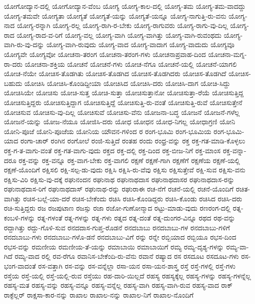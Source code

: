 {ಯೋಗೋದ್ಯಾನ-ದಲ್ಲಿ
ಯೋಗೋದ್ಯಾನ-ವೆಂಬ
ಯೋಗ್ಯ
ಯೋಗ್ಯ-ಕಾಲ-ದಲ್ಲಿ
ಯೋಗ್ಯ-ತಮ
ಯೋಗ್ಯ-ತಮ-ವಾದದ್ದು
ಯೋಗ್ಯ-ತಮವೇ
ಯೋಗ್ಯತಾ
ಯೋಗ್ಯತೆ
ಯೋಗ್ಯತೆ-ಯನ್ನು
ಯೋಗ್ಯತೆ-ಯನ್ನೂ
ಯೋಗ್ಯ-ನಾಗುತ್ತಿ-ರು-ವನು
ಯೋಗ್ಯ-ನಾದ
ಯೋಗ್ಯ-ರನ್ನಾಗಿ
ಯೋಗ್ಯ-ರಲ್ಲ
ಯೋಗ್ಯ-ರಾಗಿ-ರ-ಬೇಕು
ಯೋಗ್ಯ-ರಾಗುವರು
ಯೋಗ್ಯ-ರಾಗು-ವು-ದಿಲ್ಲ
ಯೋಗ್ಯ-ರಾದ
ಯೋಗ್ಯ-ರಾದ-ವ-ರಿಗೆ
ಯೋಗ್ಯ-ವಲ್ಲ
ಯೋಗ್ಯ-ವಾಗಿ
ಯೋಗ್ಯ-ವಾಗಿತ್ತು
ಯೋಗ್ಯ-ವಾಗಿ-ರುವಂಥದು
ಯೋಗ್ಯ-ವಾಗಿ-ರು-ವು-ದನ್ನು
ಯೋಗ್ಯ-ವಾಗಿ-ರುವುದು
ಯೋಗ್ಯ-ವಾದ
ಯೋಗ್ಯ-ವಾದಾಗ
ಯೋಗ್ಯ-ವಾದುದು
ಯೋಗ್ಯವೂ
ಯೋಗ್ಯವೇ
ಯೋಗ್ಯವೋ
ಯೋಚನಾ-ತರಂಗ
ಯೋಚನಾ-ತರಂಗ-ಗಳು
ಯೋಚನಾಪ್ರವಾಹ-ದಿಂದ
ಯೋಚನಾ-ಮಗ್ನ-ರಾ-ದರು
ಯೋಚನಾ-ಶಕ್ತಿಯ
ಯೋಚನೆ
ಯೋಚನೆ-ಗಳು
ಯೋಚ-ನೆಗೂ
ಯೋಚನೆ-ಯಲ್ಲಿ
ಯೋಚನೆ-ಯಾಗಲಿ
ಯೋಚ-ನೆಯೇ
ಯೋಚಿಸ-ತೊಡಗಿತು
ಯೋಚಿಸ-ತೊಡಗಿದ
ಯೋಚಿಸ-ತೊಡಗಿದರು
ಯೋಚಿಸ-ತೊಡಗಿದೆ
ಯೋಚಿಸ-ಬಹುದು
ಯೋಚಿಸಿ
ಯೋಚಿಸಿ-ಕೊಂಡಿದ್ದೀಯಾ
ಯೋಚಿಸಿದ
ಯೋಚಿಸಿ-ದರು
ಯೋಚಿಸಿ-ದಾಗ
ಯೋಚಿ-ಸಿದ್ದು
ಯೋಚಿಸಿಯೇ
ಯೋಚಿಸು
ಯೋಚಿ-ಸುತ್ತ
ಯೋಚಿ-ಸುತ್ತಾ
ಯೋಚಿಸುತ್ತಾನೋ
ಯೋಚಿಸುತ್ತಾ-ರೆಯೆ
ಯೋಚಿಸುತ್ತಿದ್ದ
ಯೋಚಿಸುತ್ತಿದ್ದರು
ಯೋಚಿಸುತ್ತಿದ್ದಾಗ
ಯೋಚಿಸುತ್ತಿದ್ದೆ
ಯೋಚಿಸುತ್ತಿ-ರು-ವಂತೆ
ಯೋಚಿಸುತ್ತಿ-ರುವೆ
ಯೋಚಿಸುತ್ತೇನೆ
ಯೋಚಿಸುವ
ಯೋಚಿಸು-ವು-ದಿಲ್ಲ
ಯೋಚಿಸುವೆ
ಯೋಚಿಸು-ವೆನು
ಯೋಜನಾ-ಬದ್ಧ
ಯೋಜನೆ
ಯೋಜನೆ-ಗಳೆಲ್ಲ
ಯೋಜನೆ-ಯನ್ನು
ಯೋಜ-ನೆಯೂ
ಯೋಜಿಸಿ-ದರು
ಯೋಧ
ಯೋಧನ
ಯೋಧ-ನಿಗಲ್ಲ
ಯೋಧಾಗ್ರಣಿ
ಯೋನಿ
ಯೋನಿ-ಪೂಜೆ
ಯೋನಿ-ಪೂಜೆಯ
ಯೋನಿಯ
ಯೌವನ-ಗಳಿಂದ
ರ
ರಂಗ-ಭೂಮಿ
ರಂಗ-ಭೂಮಿಯ
ರಂಗ-ಭೂಮಿ-ಯಾದ
ರಂಗಾ-ಚಾರ್
ರಂಗಿನ
ರಂಗೋಲೆ
ರಂಜಿ-ಸುತ್ತಿದೆ
ರಂತಹ
ರಂದು
ರಂಧ್ರ-ವನ್ನು
ರಕ್ತ
ರಕ್ತ-ಗತ-ಮಾಡಿ-ಕೊಳ್ಳಲು
ರಕ್ತ-ಗ-ತ-ವಾಗು-ವಂತೆ
ರಕ್ತ-ಗತ-ವಾಗು-ವುದು
ರಕ್ತದ
ರಕ್ತ-ದಲ್ಲಿ
ರಕ್ತ-ದಿಂದ
ರಕ್ತ-ಬೀಜ-ನಿಗೆ
ರಕ್ತ-ಮಾಂಸ
ರಕ್ತ-ವನ್ನಾ-ದರೂ
ರಕ್ತ-ವನ್ನು
ರಕ್ತ-ವನ್ನೂ
ರಕ್ತ-ವಾಗ-ಬೇಕು
ರಕ್ತ-ವಾಗಲಿ
ರಕ್ಷಣೆ
ರಕ್ಷಣೆ-ಗಾಗಿ
ರಕ್ಷಣೆಗೆ
ರಕ್ಷಣೆಯ
ರಕ್ಷಣೆ-ಯಲ್ಲಿ
ರಕ್ಷಣೆ-ಯೊಂದಿಗೆ
ರಕ್ಷಿಸಲಿ
ರಕ್ಷಿ-ಸಲ್ಪ-ಡು-ವುದು
ರಕ್ಷಿಸಿ
ರಕ್ಷಿಸಿ-ರು-ವೆವು
ರಕ್ಷಿಸು
ರಕ್ಷಿಸುತ್ತೇವೆ
ರಕ್ಷಿ-ಸುವ
ರಕ್ಷಿಸು-ವನು
ರಕ್ಷಿಸು-ವಿರಿ
ರಕ್ಷಿಸು-ವು-ದಕ್ಕೆ
ರಘುನಂದನ
ರಘುನಾಥ
ರಘುನಾಥದಾಸ
ರಘುನಾಥದಾಸರ
ರಘುನಾಥದಾಸ-ರನ್ನು
ರಘುನಾಥದಾಸ-ರಿಗೆ
ರಘುನಾಥದಾಸ್
ರಘುನಾಥ-ರನ್ನು
ರಘುರಾಈ
ರಚ-ನೆಗೆ
ರಚನೆ-ಯಲ್ಲಿ
ರಚನೆ-ಯೊಂದಿಗೆ
ರಚಿತ-ವಾಗಿತ್ತು
ರಚಿಸ-ಬಲ್ಲೆ-ಯಾ-ದರೆ
ರಚಿಸ-ಬೇಕೆಂದು
ರಚಿಸಿ
ರಚಿಸಿ-ಕೊಂಡಿದ್ದರು
ರಚಿಸಿ-ಕೊಂಡು
ರಚಿಸಿದ
ರಚಿಸಿ-ದರು
ರಚಿ-ಸುತ್ತಿದ್ದರು
ರಜ
ರಜಪುಟಾಣ
ರಜಸ್ಸು
ರಜಾ
ರಜೋ-ಗುಣೋನ್ಮಾದ
ರಟ್ಟು-ಮಾಡು-ವುದು
ರಣರಂಗ-ದಲ್ಲಿ
ರತ್ನ-ಕಂಬಳಿ-ಗಳನ್ನು
ರತ್ನ-ಗಳಂತೆ
ರತ್ನ-ಗಳನ್ನು
ರತ್ನ-ಗಳು
ರತ್ನದ
ರತ್ನ-ದಂತೆ
ರತ್ನ-ದುಂಗರ-ವಿನ್ನೂ
ರಥದ
ರಥ-ವನ್ನು
ರದ್ದಾಗಿತ್ತು
ರದ್ದು-ಗೊಳಿ-ಸುವ
ರನದದಾಸ-ಗುಪ್ತ-ರೊಡನೆ
ರನದಬಾಬು
ರನದಬಾಬು-ಗಳ
ರನದಬಾಬು-ಗಳಿಗೆ
ರನದಬಾಬು-ಗಳು
ರನದಬಾಬು-ಗಳೊ-ಡನೆ
ರನದಬಾಬು-ವಿಗೆ
ರನ್ನು
ರನ್ನೇ
ರಬ್ಬಿಯಾದ
ರಬ್ಬಿಯೂ
ರಭಸ-ದಿಂದ
ರಭಸ-ವನ್ನು
ರಮಣೀಯ
ರಮಣೀಯ-ತೆ-ಯನ್ನು
ರಮಾಬಾಯಿ
ರಮಾಬಾಯಿಗೆ
ರಮ್ಯ
ರಮ್ಯ-ದೃಶ್ಯ-ಗಳನ್ನು
ರಮ್ಯ-ವಾ-ಗಿದೆ
ರಮ್ಯ-ವಾದ
ರಲ್ಲಿ
ರವ-ರೆಗೂ
ರವಾನಿಸ-ಬೇಕೆಂದಿ-ರು-ವೆನು
ರವಾನೆ
ರಷ್ಯಾದ
ರಸ
ರಸದೂಟ
ರಸದೂಟ-ಗಳು
ರಸ-ಭಂಗ-ವಾದಂತೆ
ರಸ-ವತ್ತಾಗಿ
ರಸ-ವನ್ನು
ರಸ-ವನ್ನೆಲ್ಲಾ
ರಸಾ-ಯನ
ರಸಾ-ಯನ-ಶಾಸ್ತ್ರ
ರಸ್ತೆ
ರಸ್ತೆ-ಗಳಲ್ಲಿ
ರಸ್ತೆ-ಗಳು
ರಸ್ತೆಯ
ರಸ್ತೆ-ಯಲ್ಲಿ
ರಸ್ತೆ-ಯಲ್ಲಿ-ರುವ
ರಸ್ತೆಯು
ರಹ-ದಾರಿ-ಯಿಲ್ಲದೆ
ರಹಸ್ಯ
ರಹಸ್ಯಕ್ಕೆಲ್ಲ
ರಹಸ್ಯ-ಗಳನ್ನು
ರಹಸ್ಯ-ಗಳನ್ನೆಲ್ಲ
ರಹಸ್ಯ-ಮತ
ರಹಸ್ಯ-ವನ್ನು
ರಹಸ್ಯ-ವನ್ನೂ
ರಹಸ್ಯ-ವನ್ನೆಲ್ಲ
ರಹಸ್ಯ-ವಾಗಿ
ರಹಸ್ಯ-ವಾಗಿ-ರುವ
ರಹಸ್ಯ-ವಾದ
ರಾಕ್
ರಾಕ್ಫೆಲ್ಲರ್
ರಾಕ್ಷಸಾ-ಕಾರ-ನನ್ನು
ರಾಖಾಲ
ರಾಖಾಲ-ನನ್ನು
ರಾಖಾಲ-ನಿಗೆ
ರಾಖಾಲ-ನೊಂದಿಗೆ
}
